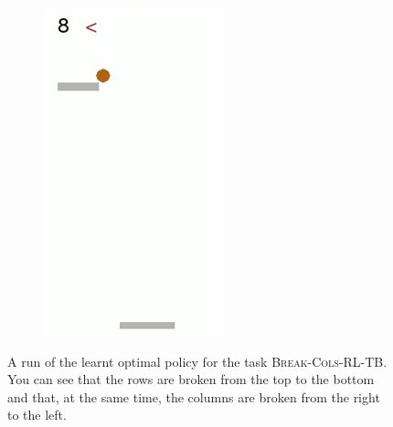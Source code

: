 \begin{figure}[h]
\begin{subfigure}[b]{0.18\textwidth}
		\includegraphics[width=\textwidth]{images/breakout-33-rl-tb-5.png}
	\end{subfigure}
	\caption{A run of the learnt optimal policy for the task \textsc{Break-Cols-RL-TB}. You can see that the rows are broken from the top to the bottom and that, at the same time, the columns are broken from the right to the left.}\label{exa:breakout-33-rl-tb}
\end{figure}

